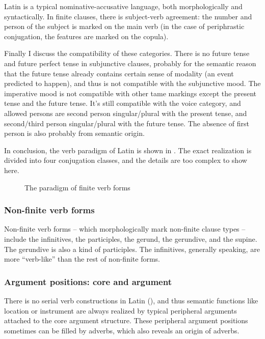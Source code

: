 \documentclass{article}
\begin{document}
Latin is a typical nominative-accusative language,
both morphologically and syntactically.
In finite clauses, 
there is subject-verb agreement:
the number and person of the subject is marked on the main verb
(in the case of periphrastic conjugation,
the features are marked on the copula).

Finally I discuss the compatibility of these categories.
There is no future tense and future perfect tense in subjunctive clauses,
probably for the semantic reason
that the future tense already contains certain sense of modality
(an event predicted to happen),
and thus is not compatible with the subjunctive mood.
The imperative mood is not compatible with other \ac{tame} markings
except the present tense and the future tense.
It's still compatible with the voice category,
and allowed persons are 
second person singular/plural with the present tense,
and second/third person singular/plural with the future tense.
The absence of first person is also probably from semantic origin.

In conclusion, the verb paradigm of Latin is shown in .
The exact realization is divided into four conjugation classes,
and the details are too complex to show here.

\begin{figure}
    \centering
    
    \caption{The paradigm of finite verb forms}
    \label{fig:paradigm-finite-verb}
\end{figure}

\subsubsection{Non-finite verb forms}

Non-finite verb forms -- which morphologically mark non-finite clause types --
include the infinitives, the participles, the gerund, the gerundive, and the supine.
The gerundive is also a kind of participles. 
The infinitives, generally speaking, are more ``verb-like'' than the rest of non-finite forms.

\subsubsection{Argument positions: core and argument}

There is no serial verb constructions in Latin (),
and thus semantic functions like location or instrument 
are always realized by typical peripheral arguments
attached to the core argument structure.
These peripheral argument positions sometimes can be filled by adverbs,
which also reveals an origin of adverbs.
\end{document}
